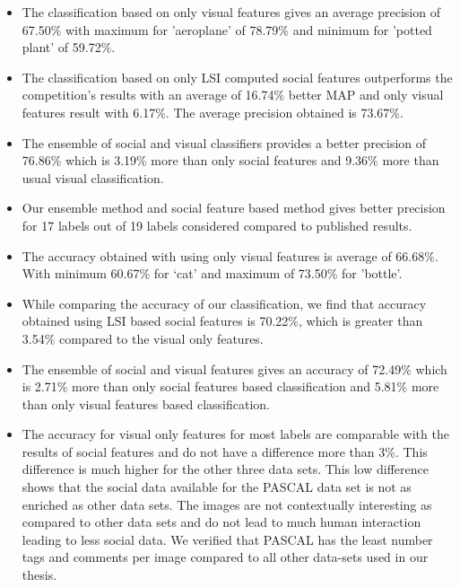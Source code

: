 \begin{itemize}
\item The classification based on only visual features gives an average precision of 67.50\% with maximum for 'aeroplane' of 78.79\% 
and minimum for 'potted plant' of 59.72\%.
\item The classification based on only LSI computed social features outperforms the competition's results with an average of 16.74\% 
better MAP and only visual features result with 6.17\%. The average precision obtained is 73.67\%.
\item The ensemble of social and visual classifiers provides a better precision of 76.86\% which is 3.19\% more than only social features 
and 9.36\% more than usual visual classification.
\item Our ensemble method and social feature based method gives better precision for 17 labels out of 19 labels considered compared 
to published results.
\item The accuracy obtained with using only visual features is average of 66.68\%. With minimum 60.67\% for `cat' and maximum of 
73.50\% for 'bottle'.
\item While comparing the accuracy of our classification, we find that accuracy obtained using LSI based social features is 70.22\%, 
which is greater than 3.54\% compared to the visual only features.
\item The ensemble of social and visual features gives an accuracy of 72.49\% which is 2.71\% more than only social features based 
classification and 5.81\% more than only visual features based classification.
\item The accuracy for visual only features for most labels are comparable with the results of social features and do not have a difference more than 3\%. This difference is much higher for the other three data sets. This low difference shows that the social data available for the PASCAL data set is not as enriched as other data sets. The images are not contextually interesting as compared to other data sets and do not lead to much human interaction leading to less social data. We verified that PASCAL has the least number tags and comments per image compared to all other data-sets used in our thesis.
\end{itemize}

